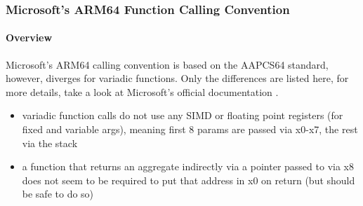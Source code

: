\subsubsection{Microsoft's ARM64 Function Calling Convention}

\paragraph{Overview}

Microsoft's ARM64 calling convention is based on the AAPCS64 standard, however, diverges for variadic functions.
Only the differences are listed here, for more details, take a look at Microsoft's official documentation \cite{MicrosoftARM64}.

\begin{itemize}
\item variadic function calls do not use any SIMD or floating point registers (for fixed and variable args), meaning first 8 params are passed via x0-x7, the rest via the stack
\item a function that returns an aggregate indirectly via a pointer passed to via x8 does not seem to be required to put that address in x0 on return (but should be safe to do so)
\end{itemize}

